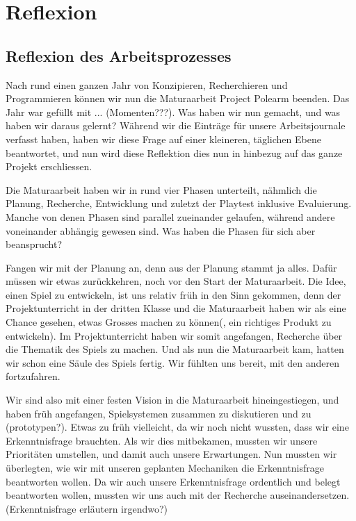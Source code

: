 \documentclass[../Main.tex]{subfiles}
\begin{document}
\section{Reflexion} \label{sec:Reflexion}

\subsection{Reflexion des Arbeitsprozesses}

Nach rund einen ganzen Jahr von Konzipieren, Recherchieren und Programmieren können wir nun die Maturaarbeit Project Polearm beenden. Das Jahr war gefüllt mit ... (Momenten???). Was haben wir nun gemacht, und was haben wir daraus gelernt? Während wir die Einträge für unsere Arbeitsjournale verfasst haben, haben wir diese Frage auf einer kleineren, täglichen Ebene beantwortet, und nun wird diese Reflektion dies nun in hinbezug auf das ganze Projekt erschliessen.

Die Maturaarbeit haben wir in rund vier Phasen unterteilt, nähmlich die Planung, Recherche, Entwicklung und zuletzt der Playtest inklusive Evaluierung. Manche von denen Phasen sind parallel zueinander gelaufen, während andere voneinander abhängig gewesen sind. Was haben die Phasen für sich aber beansprucht?

Fangen wir mit der Planung an, denn aus der Planung stammt ja alles. Dafür müssen wir etwas zurückkehren, noch vor den Start der Maturaarbeit. Die Idee, einen Spiel zu entwickeln, ist uns relativ früh in den Sinn gekommen, denn der Projektunterricht in der dritten Klasse und die Maturaarbeit haben wir als eine Chance gesehen, etwas Grosses machen zu können(, ein richtiges Produkt zu entwickeln). Im Projektunterricht haben wir somit angefangen, Recherche über die Thematik des Spiels zu machen. Und als nun die Maturaarbeit kam, hatten wir schon eine Säule des Spiels fertig. Wir fühlten uns bereit, mit den anderen fortzufahren.

Wir sind also mit einer festen Vision in die Maturaarbeit hineingestiegen, und haben früh angefangen, Spielsystemen zusammen zu diskutieren und zu (prototypen?). Etwas zu früh vielleicht, da wir noch nicht wussten, dass wir eine Erkenntnisfrage brauchten. Als wir dies mitbekamen, mussten wir unsere Prioritäten umstellen, und damit auch unsere Erwartungen. Nun mussten wir überlegten, wie wir mit unseren geplanten Mechaniken die Erkenntnisfrage beantworten wollen.  Da wir auch unsere Erkenntnisfrage ordentlich und belegt beantworten wollen, mussten wir uns auch mit der Recherche auseinandersetzen. (Erkenntnisfrage erläutern irgendwo?)
\end{document}
